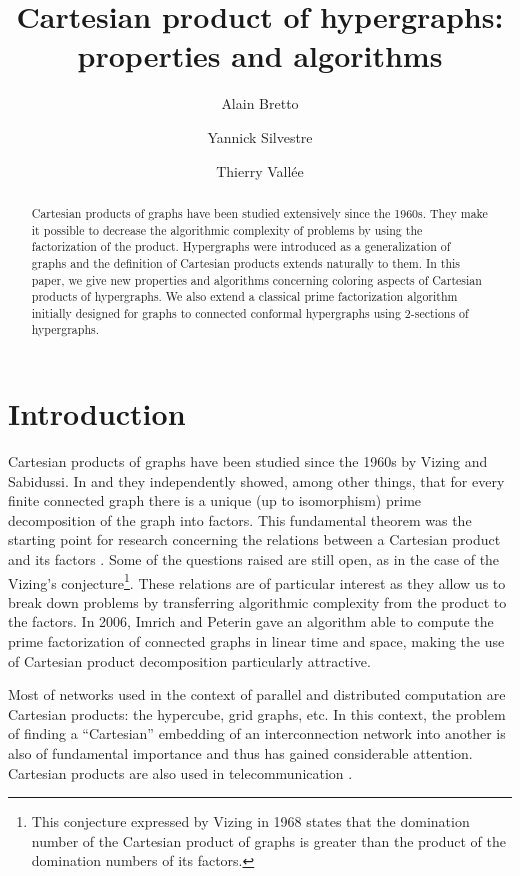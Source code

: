\documentclass[copyright]{eptcs}
\title{Cartesian product of hypergraphs: properties and algorithms}
\author{Alain  Bretto \email{alain.bretto@info.unicaen.fr} \and Yannick Silvestre \email{yannick.silvestre@info.unicaen.fr}  \and Thierry Vall\'ee \email{vallee@pps.jussieu.fr}
\institute{Universit\'e de Caen, GREYC CNRS UMR-6072, Campus
II, Bd Marechal Juin BP 5186, 14032 Caen cedex, France.}}
\begin{document}
\nocite{*}
\maketitle

\begin{abstract}
Cartesian products of graphs have been studied extensively since the 1960s. They make it possible to decrease the algorithmic complexity of problems by using the factorization of the product. Hypergraphs were introduced as a generalization of graphs and the definition of Cartesian products extends naturally to them. In this paper, we give new properties and algorithms concerning coloring aspects of Cartesian products of hypergraphs. We also extend a classical prime factorization algorithm initially designed for graphs to connected conformal hypergraphs using 2-sections of hypergraphs.
\end{abstract}

\section{Introduction}
Cartesian products of graphs have been studied since the 1960s by Vizing and Sabidussi. In \cite{Vizing} and \cite{Sabi} they independently showed, among other things, that for every finite connected graph there is a unique (up to isomorphism) prime decomposition of the graph into factors. This fundamental theorem was the starting point for research concerning the relations between a Cartesian product and its factors \cite{Zerovnik,ImPiZe,AC,Lauri}.
Some of the questions raised are still open, as in the case of the Vizing's conjecture\footnote{This conjecture expressed by Vizing in 1968 states that the domination number of the Cartesian product of graphs is greater than the product of the domination numbers of its factors.}.
These relations are of particular interest as they allow us to break down problems by transferring algorithmic complexity from the product to the factors. In 2006, Imrich and Peterin \cite{ImPe} gave an algorithm able to compute the prime factorization of connected graphs in linear time and space, making the use of Cartesian product decomposition particularly attractive.

Most of networks used in the context of parallel and distributed computation are Cartesian products: the hypercube, grid graphs, etc. In this context, the problem of finding a ``Cartesian'' embedding of an interconnection
network into another is also of fundamental importance and thus has gained considerable attention. Cartesian products are also used in telecommunication \cite{Vesel}.\smallskip
\end{document}
